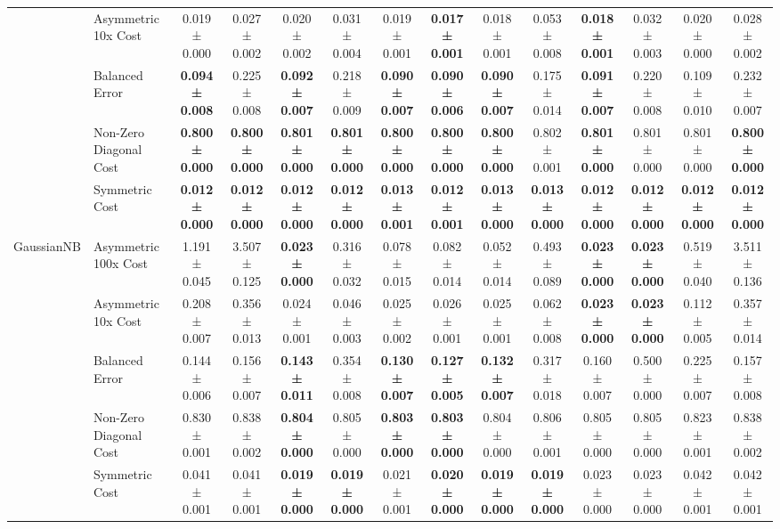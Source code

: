 \begin{table}[H]
{\begin{tabular}{llcccccccccccc}
 & Asymmetric 10x Cost & 0.019 ± 0.000 & 0.027 ± 0.002 & 0.020 ± 0.002 & 0.031 ± 0.004 & 0.019 ± 0.001 & \textbf{0.017 ± 0.001} & 0.018 ± 0.001 & 0.053 ± 0.008 & \textbf{0.018 ± 0.001} & 0.032 ± 0.003 & 0.020 ± 0.000 & 0.028 ± 0.002 \\
 & Balanced Error & \textbf{0.094 ± 0.008} & 0.225 ± 0.008 & \textbf{0.092 ± 0.007} & 0.218 ± 0.009 & \textbf{0.090 ± 0.007} & \textbf{0.090 ± 0.006} & \textbf{0.090 ± 0.007} & 0.175 ± 0.014 & \textbf{0.091 ± 0.007} & 0.220 ± 0.008 & 0.109 ± 0.010 & 0.232 ± 0.007 \\
 & Non-Zero Diagonal Cost & \textbf{0.800 ± 0.000} & \textbf{0.800 ± 0.000} & \textbf{0.801 ± 0.000} & \textbf{0.801 ± 0.000} & \textbf{0.800 ± 0.000} & \textbf{0.800 ± 0.000} & \textbf{0.800 ± 0.000} & 0.802 ± 0.001 & \textbf{0.801 ± 0.000} & 0.801 ± 0.000 & 0.801 ± 0.000 & \textbf{0.800 ± 0.000} \\
 & Symmetric Cost & \textbf{0.012 ± 0.000} & \textbf{0.012 ± 0.000} & \textbf{0.012 ± 0.000} & \textbf{0.012 ± 0.000} & \textbf{0.013 ± 0.001} & \textbf{0.012 ± 0.001} & \textbf{0.013 ± 0.000} & \textbf{0.013 ± 0.000} & \textbf{0.012 ± 0.000} & \textbf{0.012 ± 0.000} & \textbf{0.012 ± 0.000} & \textbf{0.012 ± 0.000} \\
\cline{1-14}
\multirow[t]{5}{*}{GaussianNB} & Asymmetric 100x Cost & 1.191 ± 0.045 & 3.507 ± 0.125 & \textbf{0.023 ± 0.000} & 0.316 ± 0.032 & 0.078 ± 0.015 & 0.082 ± 0.014 & 0.052 ± 0.014 & 0.493 ± 0.089 & \textbf{0.023 ± 0.000} & \textbf{0.023 ± 0.000} & 0.519 ± 0.040 & 3.511 ± 0.136 \\
 & Asymmetric 10x Cost & 0.208 ± 0.007 & 0.356 ± 0.013 & 0.024 ± 0.001 & 0.046 ± 0.003 & 0.025 ± 0.002 & 0.026 ± 0.001 & 0.025 ± 0.001 & 0.062 ± 0.008 & \textbf{0.023 ± 0.000} & \textbf{0.023 ± 0.000} & 0.112 ± 0.005 & 0.357 ± 0.014 \\
 & Balanced Error & 0.144 ± 0.006 & 0.156 ± 0.007 & \textbf{0.143 ± 0.011} & 0.354 ± 0.008 & \textbf{0.130 ± 0.007} & \textbf{0.127 ± 0.005} & \textbf{0.132 ± 0.007} & 0.317 ± 0.018 & 0.160 ± 0.007 & 0.500 ± 0.000 & 0.225 ± 0.007 & 0.157 ± 0.008 \\
 & Non-Zero Diagonal Cost & 0.830 ± 0.001 & 0.838 ± 0.002 & \textbf{0.804 ± 0.000} & 0.805 ± 0.000 & \textbf{0.803 ± 0.000} & \textbf{0.803 ± 0.000} & 0.804 ± 0.000 & 0.806 ± 0.001 & 0.805 ± 0.000 & 0.805 ± 0.000 & 0.823 ± 0.001 & 0.838 ± 0.002 \\
 & Symmetric Cost & 0.041 ± 0.001 & 0.041 ± 0.001 & \textbf{0.019 ± 0.000} & \textbf{0.019 ± 0.000} & 0.021 ± 0.001 & \textbf{0.020 ± 0.000} & \textbf{0.019 ± 0.000} & \textbf{0.019 ± 0.000} & 0.023 ± 0.000 & 0.023 ± 0.000 & 0.042 ± 0.001 & 0.042 ± 0.001 \\

\end{tabular}}
\end{table}
